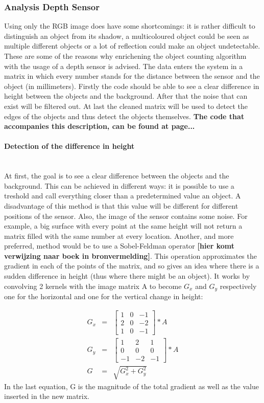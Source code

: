 \documentclass[11pt]{article}
\begin{document}
\subsubsection{Analysis Depth Sensor}
Using only the RGB image does have some shortcomings: it is rather difficult to distinguish an object from its shadow, a multicoloured object could be seen as multiple different objects or a lot of reflection could make an object undetectable. These are some of the reasons why enrichening the object counting algorithm with the usage of a depth sensor is advised. The data enters the system in a matrix in which every number stands for the distance between the sensor and the object (in millimeters). Firstly the code should be able to see a clear difference in height between the objects and the background. After that the noise that can exist will be filtered out. At last the cleaned matrix will be used to detect the edges of the objects and thus detect the objects themselves. \textbf{The code that accompanies this description, can be found at page...}
 
\paragraph{Detection of the difference in height}\mbox{}\\
At first, the goal is to see a clear difference between the objects and the background. This can be achieved in different ways: it is possible to use a treshold and call everything closer than a predetermined value an object. A disadvantage of this method is that this value will be different for different positions of the sensor. Also, the image of the sensor contains some noise. For example, a big surface with every point at the same height will not return a matrix filled with the same number at every location. Another, and more preferred, method would be to use a Sobel-Feldman operator \textbf{[hier komt verwijzing naar boek in bronvermelding]}. This operation approximates the gradient in each of the points of the matrix, and so gives an idea where there is a sudden difference in height (thus where there might be an object). It works by convolving 2 kernels with the image matrix A to become $G_{x}$ and $G_{y}$ respectively one for the horizontal and one for the vertical change in height: 

\begin{eqnarray*}
G_{x} &=& 
	\begin{bmatrix}
		1&0&-1\\
		2&0&-2\\
		1&0&-1
	\end{bmatrix}
	*A \\
G_{y} &=& 
	\begin{bmatrix}
		1&2&1\\
		0&0&0\\
		-1&-2&-1
	\end{bmatrix}
	*A\\
G &=& \sqrt{G_{x}^2+G_{y}^2}
\end{eqnarray*}
In the last equation, G is the magnitude of the total gradient as well as the value inserted in the new matrix.
\end{document}
